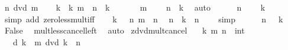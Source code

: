 \begin{isabellebody}
\ {\isachardoublequoteopen}n\ dvd\ m{\isachardoublequoteclose}\ \isamarkupfalse%
\ \isamarkupfalse%
\ k\ \ k{\isacharcolon}{\kern0pt}\ {\isachardoublequoteopen}m\ {\isacharequal}{\kern0pt}\ n\ {\isacharasterisk}{\kern0pt}\ k{\isachardoublequoteclose}\ \isacommand{{\isachardot}{\kern0pt}{\isachardot}{\kern0pt}}\isamarkupfalse%
\isanewline
\ \ \isamarkupfalse%
\ {\isacartoucheopen}{}\ {\isacharless}{\kern0pt}\ m{\isacartoucheclose}\ \isamarkupfalse%
\ {\isachardoublequoteopen}{}\ {\isacharless}{\kern0pt}\ n\ {\isacharasterisk}{\kern0pt}\ k{\isachardoublequoteclose}\ \isamarkupfalse%
\ auto\isanewline
\ \ \isamarkupfalse%
\ {\isacartoucheopen}{}\ {\isacharless}{\kern0pt}\ n{\isacartoucheclose}\ \isamarkupfalse%
\ {\isachardoublequoteopen}{}\ {\isacharless}{\kern0pt}\ k{\isachardoublequoteclose}\ \isamarkupfalse%
\ {\isacharparenleft}{\kern0pt}simp\ add{\isacharcolon}{\kern0pt}\ zero{\isacharunderscore}{\kern0pt}less{\isacharunderscore}{\kern0pt}mult{\isacharunderscore}{\kern0pt}iff{\isacharparenright}{\kern0pt}\isanewline
\ \ \isamarkupfalse%
\ k\ {\isacartoucheopen}{}\ {\isacharless}{\kern0pt}\ n{\isacartoucheclose}\ {\isacartoucheopen}m\ {\isacharless}{\kern0pt}\ n{\isacartoucheclose}\ \isamarkupfalse%
\ {\isachardoublequoteopen}n\ {\isacharasterisk}{\kern0pt}\ k\ {\isacharless}{\kern0pt}\ n\ {\isacharasterisk}{\kern0pt}\ {}{\isachardoublequoteclose}\ \isamarkupfalse%
\ simp\isanewline
\ \ \isamarkupfalse%
\ {\isacartoucheopen}{}\ {\isacharless}{\kern0pt}\ n{\isacartoucheclose}\ {\isacartoucheopen}{}\ {\isacharless}{\kern0pt}\ k{\isacartoucheclose}\ \isamarkupfalse%
\ False\ \isamarkupfalse%
\ mult{\isacharunderscore}{\kern0pt}less{\isacharunderscore}{\kern0pt}cancel{\isacharunderscore}{\kern0pt}left\ \isamarkupfalse%
\ auto\isanewline
{}\isamarkupfalse%
%
\endisatagproof
{\isafoldproof}%
%
\isadelimproof
\isanewline
%
\endisadelimproof
\isanewline
{}\isamarkupfalse%
\ zdvd{\isacharunderscore}{\kern0pt}mult{\isacharunderscore}{\kern0pt}cancel{\isacharcolon}{\kern0pt}\isanewline
\ \ \ k\ m\ n\ {\isacharcolon}{\kern0pt}{\isacharcolon}{\kern0pt}\ int\isanewline
\ \ \ d{\isacharcolon}{\kern0pt}\ {\isachardoublequoteopen}k\ {\isacharasterisk}{\kern0pt}\ m\ dvd\ k\ {\isacharasterisk}{\kern0pt}\ n{\isachardoublequoteclose}\isanewline

\end{isabellebody}
